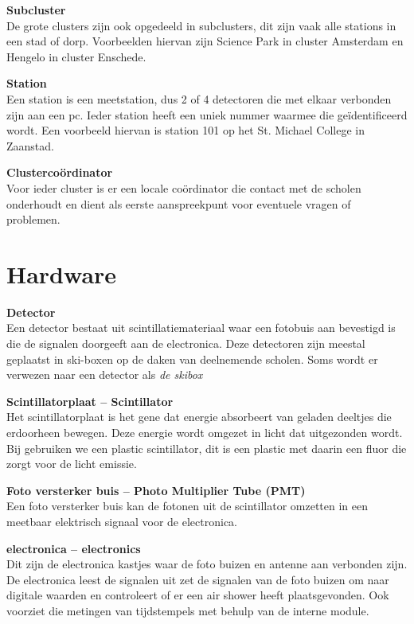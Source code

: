 \textbf{Subcluster} \\
De grote clusters zijn ook opgedeeld in subclusters, dit zijn vaak alle
stations in een stad of dorp. Voorbeelden hiervan zijn Science Park in
cluster Amsterdam en Hengelo in cluster Enschede.

\textbf{Station} \\
Een station is een meetstation, dus 2 of 4 detectoren die met elkaar
verbonden zijn aan een pc. Ieder station heeft een uniek nummer waarmee
die geïdentificeerd wordt. Een voorbeeld hiervan is station 101 op het
St. Michael College in Zaanstad.

\textbf{Clustercoördinator} \\
Voor ieder cluster is er een locale coördinator die contact met de
scholen onderhoudt en dient als eerste aanspreekpunt voor eventuele
vragen of problemen.


\section{Hardware}

\textbf{Detector} \\
Een detector bestaat uit scintillatiemateriaal waar een fotobuis aan
bevestigd is die de signalen doorgeeft aan de \hisparc electronica. Deze
detectoren zijn meestal geplaatst in ski-boxen op de daken van
deelnemende scholen. Soms wordt er verwezen naar een detector als
\emph{de skibox}

\textbf{Scintillatorplaat -- Scintillator} \\
Het scintillatorplaat is het gene dat energie absorbeert van geladen
deeltjes die erdoorheen bewegen. Deze energie wordt omgezet in licht dat
uitgezonden wordt. Bij \hisparc gebruiken we een plastic scintillator,
dit is een plastic met daarin een fluor die zorgt voor de licht emissie.

\textbf{Foto versterker buis -- Photo Multiplier Tube (PMT)} \\
Een foto versterker buis kan de fotonen uit de scintillator omzetten in
een meetbaar elektrisch signaal voor de \hisparc electronica.

\textbf{\hisparc electronica -- \hisparc electronics} \\
Dit zijn de electronica kastjes waar de foto buizen en \gps antenne aan
verbonden zijn. De electronica leest de signalen uit zet de signalen van
de foto buizen om naar digitale waarden en controleert of er een air
shower heeft plaatsgevonden. Ook voorziet die metingen van tijdstempels
met behulp van de interne \gps module.

